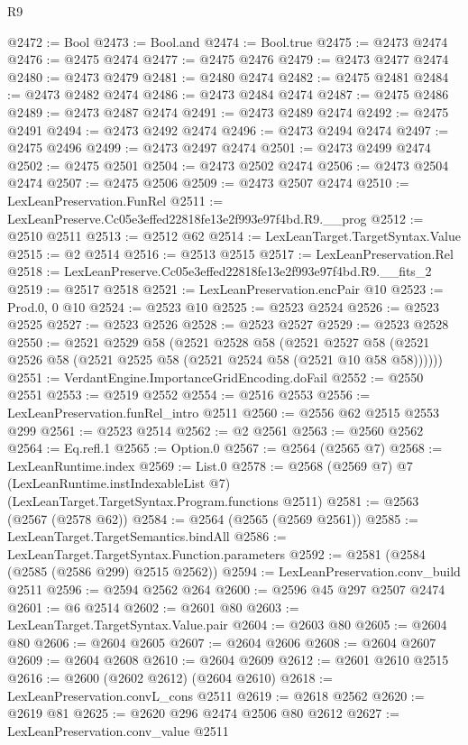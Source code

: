 \begin{lexlean}{R9}
\begin{coremodule}
@2472 := Bool
@2473 := Bool.and
@2474 := Bool.true
@2475 := @2473 @2474
@2476 := @2475 @2474
@2477 := @2475 @2476
@2479 := @2473 @2477 @2474
@2480 := @2473 @2479
@2481 := @2480 @2474
@2482 := @2475 @2481
@2484 := @2473 @2482 @2474
@2486 := @2473 @2484 @2474
@2487 := @2475 @2486
@2489 := @2473 @2487 @2474
@2491 := @2473 @2489 @2474
@2492 := @2475 @2491
@2494 := @2473 @2492 @2474
@2496 := @2473 @2494 @2474
@2497 := @2475 @2496
@2499 := @2473 @2497 @2474
@2501 := @2473 @2499 @2474
@2502 := @2475 @2501
@2504 := @2473 @2502 @2474
@2506 := @2473 @2504 @2474
@2507 := @2475 @2506
@2509 := @2473 @2507 @2474
@2510 := LexLeanPreservation.FunRel
@2511 := LexLeanPreserve.Cc05e3effed22818fe13e2f993e97f4bd.R9.__prog
@2512 := @2510 @2511
@2513 := @2512 @62
@2514 := LexLeanTarget.TargetSyntax.Value
@2515 := @2 @2514
@2516 := @2513 @2515
@2517 := LexLeanPreservation.Rel
@2518 := LexLeanPreserve.Cc05e3effed22818fe13e2f993e97f4bd.R9.__fits_2
@2519 := @2517 @2518
@2521 := LexLeanPreservation.encPair @10
@2523 := Prod.{0, 0} @10
@2524 := @2523 @10
@2525 := @2523 @2524
@2526 := @2523 @2525
@2527 := @2523 @2526
@2528 := @2523 @2527
@2529 := @2523 @2528
@2550 := @2521
    @2529
    @58
    (@2521
      @2528
      @58
      (@2521 @2527 @58 (@2521 @2526 @58 (@2521 @2525 @58 (@2521 @2524 @58 (@2521 @10 @58 @58))))))
@2551 := VerdantEngine.ImportanceGridEncoding.doFail
@2552 := @2550 @2551
@2553 := @2519 @2552
@2554 := @2516 @2553
@2556 := LexLeanPreservation.funRel_intro @2511
@2560 := @2556 @62 @2515 @2553 @299
@2561 := @2523 @2514
@2562 := @2 @2561
@2563 := @2560 @2562
@2564 := Eq.refl.{1}
@2565 := Option.{0}
@2567 := @2564 (@2565 @7)
@2568 := LexLeanRuntime.index
@2569 := List.{0}
@2578 := @2568
    (@2569 @7)
    @7
    (LexLeanRuntime.instIndexableList @7)
    (LexLeanTarget.TargetSyntax.Program.functions @2511)
@2581 := @2563 (@2567 (@2578 @62))
@2584 := @2564 (@2565 (@2569 @2561))
@2585 := LexLeanTarget.TargetSemantics.bindAll
@2586 := LexLeanTarget.TargetSyntax.Function.parameters
@2592 := @2581 (@2584 (@2585 (@2586 @299) @2515 @2562))
@2594 := LexLeanPreservation.conv_build @2511
@2596 := @2594 @2562 @264
@2600 := @2596 @45 @297 @2507 @2474
@2601 := @6 @2514
@2602 := @2601 @80
@2603 := LexLeanTarget.TargetSyntax.Value.pair
@2604 := @2603 @80
@2605 := @2604 @80
@2606 := @2604 @2605
@2607 := @2604 @2606
@2608 := @2604 @2607
@2609 := @2604 @2608
@2610 := @2604 @2609
@2612 := @2601 @2610 @2515
@2616 := @2600 (@2602 @2612) (@2604 @2610)
@2618 := LexLeanPreservation.convL_cons @2511
@2619 := @2618 @2562
@2620 := @2619 @81
@2625 := @2620 @296 @2474 @2506 @80 @2612
@2627 := LexLeanPreservation.conv_value @2511

\end{coremodule}
\end{lexlean}
